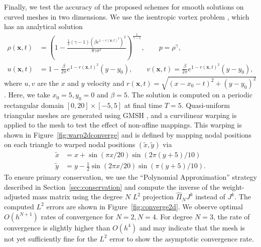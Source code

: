 \documentclass[10pt]{amsart}
\theoremstyle{definition}
\theoremstyle{lemma}
\theoremstyle{theorem}
\theoremstyle{assumption}
\renewcommand{\hat}{\widehat}
\renewcommand{\tilde}{\widetilde}
\newcommand{\LRp}[1]{\left( #1 \right)}
\begin{document}
{Finally, we test the accuracy of the proposed schemes for smooth solutions on curved meshes in two dimensions.  
We use the isentropic vortex problem \cite{shu1998essentially}, which has an analytical solution 
\begin{align}
\rho(\bm{x},t) &= \LRp{1 - \frac{\frac{1}{2}(\gamma-1)(\beta e^{1-r(\bm{x},t)^2})^2}{8\gamma \pi^2}}^{\frac{1}{\gamma-1}}, \qquad p = \rho^{\gamma},\\
u(\bm{x},t) &= 1 - \frac{\beta}{2\pi} e^{1-r(\bm{x},t)^2}(y-y_0), \qquad v(\bm{x},t) = \frac{\beta}{2\pi} e^{1-r(\bm{x},t)^2}(y-y_0),\nonumber
\end{align}
where $u, v$ are the $x$ and $y$ velocity and $r(\bm{x},t) = \sqrt{(x-x_0-t)^2 + (y-y_0)^2}$.  Here, we take $x_0 = 5, y_0 = 0$ and $\beta = 5$.  
The solution is computed on a periodic rectangular domain $[0, 20] \times [-5,5]$ at final time $T=5$.  Quasi-uniform triangular meshes are generated using \textsc{GMSH} \cite{geuzaine2009gmsh}, and a curvilinear warping is applied to the mesh to test the effect of non-affine mappings.  This warping is shown in Figure~\ref{fig:warp2dconverge} and is defined by mapping nodal positions on each triangle to warped nodal positions $(\tilde{x},\tilde{y})$ via
\begin{align*}
\tilde{x} &= x + \sin\LRp{\pi x / 20}\sin\LRp{2\pi (y+5)/10}\\
\tilde{y} &= y - \frac{1}{2}\sin\LRp{2 \pi x / 20}\sin\LRp{\pi (y+5)/10}.
\end{align*}  
To ensure primary conservation, we use the ``Polynomial Approximation'' strategy described in Section~\ref{sec:conservation} and compute the inverse of the weight-adjusted mass matrix using the degree $N$ $L^2$ projection $\hat{\Pi}_N J^k$ instead of $J^k$.  The computed $L^2$ errors are shown in Figure~\ref{fig:converge2d}.  We observe optimal $O(h^{N+1})$ rates of convergence for $N=2, N= 4$.  For degree $N=3$, the rate of convergence is slightly higher than $O(h^{4})$ and may indicate that the mesh is not yet sufficiently fine for the $L^2$ error to show the asymptotic convergence rate.  

\begin{figure}
\centering
{}
\end{figure}}
\end{document}
